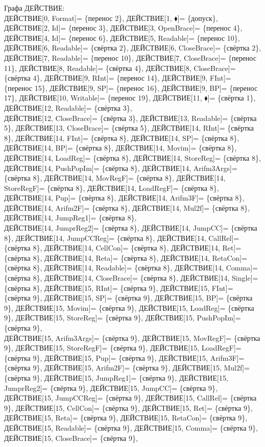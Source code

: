 \documentclass[a0]{a0poster}
\begin{document}
\tiny 
Графа ДЕЙСТВИЕ:\\
ДЕЙСТВИЕ[0, Format]= \{перенос 2\}, ДЕЙСТВИЕ[1, $\blacklozenge$]= \{допуск\}, ДЕЙСТВИЕ[2, Id]= \{перенос 3\}, ДЕЙСТВИЕ[3, OpenBrace]= \{перенос 4\}, ДЕЙСТВИЕ[4, Id]= \{перенос 6\}, ДЕЙСТВИЕ[5, Readable]= \{перенос 10\}, ДЕЙСТВИЕ[6, Readable]= \{свёртка 2\}, ДЕЙСТВИЕ[6, CloseBrace]= \{свёртка 2\}, ДЕЙСТВИЕ[7, Readable]= \{перенос 10\}, ДЕЙСТВИЕ[7, CloseBrace]= \{перенос 11\}, ДЕЙСТВИЕ[8, Readable]= \{свёртка 4\}, ДЕЙСТВИЕ[8, CloseBrace]= \{свёртка 4\}, ДЕЙСТВИЕ[9, RInt]= \{перенос 14\}, ДЕЙСТВИЕ[9, FInt]= \{перенос 15\}, ДЕЙСТВИЕ[9, SP]= \{перенос 16\}, ДЕЙСТВИЕ[9, BP]= \{перенос 17\}, ДЕЙСТВИЕ[10, Writable]= \{перенос 19\}, ДЕЙСТВИЕ[11, $\blacklozenge$]= \{свёртка 1\}, ДЕЙСТВИЕ[12, Readable]= \{свёртка 3\}, \\
ДЕЙСТВИЕ[12, CloseBrace]= \{свёртка 3\}, ДЕЙСТВИЕ[13, Readable]= \{свёртка 5\}, ДЕЙСТВИЕ[13, CloseBrace]= \{свёртка 5\}, ДЕЙСТВИЕ[14, RInt]= \{свёртка 8\}, ДЕЙСТВИЕ[14, FInt]= \{свёртка 8\}, ДЕЙСТВИЕ[14, SP]= \{свёртка 8\}, ДЕЙСТВИЕ[14, BP]= \{свёртка 8\}, ДЕЙСТВИЕ[14, Movim]= \{свёртка 8\}, ДЕЙСТВИЕ[14, LoadReg]= \{свёртка 8\}, ДЕЙСТВИЕ[14, StoreReg]= \{свёртка 8\}, ДЕЙСТВИЕ[14, PushPopIm]= \{свёртка 8\}, ДЕЙСТВИЕ[14, Arifm3Args]= \{свёртка 8\}, ДЕЙСТВИЕ[14, MovRegF]= \{свёртка 8\}, ДЕЙСТВИЕ[14, StoreRegF]= \{свёртка 8\}, ДЕЙСТВИЕ[14, LoadRegF]= \{свёртка 8\}, ДЕЙСТВИЕ[14, Pup]= \{свёртка 8\}, ДЕЙСТВИЕ[14, Arifm3F]= \{свёртка 8\}, ДЕЙСТВИЕ[14, Arifm2F]= \{свёртка 8\}, ДЕЙСТВИЕ[14, Mul2f]= \{свёртка 8\}, ДЕЙСТВИЕ[14, JumpReg1]= \{свёртка 8\}, \\
ДЕЙСТВИЕ[14, JumprReg2]= \{свёртка 8\}, ДЕЙСТВИЕ[14, JumpCC]= \{свёртка 8\}, ДЕЙСТВИЕ[14, JumpCCReg]= \{свёртка 8\}, ДЕЙСТВИЕ[14, CallRel]= \{свёртка 8\}, ДЕЙСТВИЕ[14, CellCon]= \{свёртка 8\}, ДЕЙСТВИЕ[14, Ret]= \{свёртка 8\}, ДЕЙСТВИЕ[14, Reta]= \{свёртка 8\}, ДЕЙСТВИЕ[14, RetaCon]= \{свёртка 8\}, ДЕЙСТВИЕ[14, Readable]= \{свёртка 8\}, ДЕЙСТВИЕ[14, Comma]= \{свёртка 8\}, ДЕЙСТВИЕ[14, CloseBrace]= \{свёртка 8\}, ДЕЙСТВИЕ[14, Single]= \{свёртка 8\}, ДЕЙСТВИЕ[15, RInt]= \{свёртка 9\}, ДЕЙСТВИЕ[15, FInt]= \{свёртка 9\}, ДЕЙСТВИЕ[15, SP]= \{свёртка 9\}, ДЕЙСТВИЕ[15, BP]= \{свёртка 9\}, ДЕЙСТВИЕ[15, Movim]= \{свёртка 9\}, ДЕЙСТВИЕ[15, LoadReg]= \{свёртка 9\}, ДЕЙСТВИЕ[15, StoreReg]= \{свёртка 9\}, ДЕЙСТВИЕ[15, PushPopIm]= \{свёртка 9\}, \\
ДЕЙСТВИЕ[15, Arifm3Args]= \{свёртка 9\}, ДЕЙСТВИЕ[15, MovRegF]= \{свёртка 9\}, ДЕЙСТВИЕ[15, StoreRegF]= \{свёртка 9\}, ДЕЙСТВИЕ[15, LoadRegF]= \{свёртка 9\}, ДЕЙСТВИЕ[15, Pup]= \{свёртка 9\}, ДЕЙСТВИЕ[15, Arifm3F]= \{свёртка 9\}, ДЕЙСТВИЕ[15, Arifm2F]= \{свёртка 9\}, ДЕЙСТВИЕ[15, Mul2f]= \{свёртка 9\}, ДЕЙСТВИЕ[15, JumpReg1]= \{свёртка 9\}, ДЕЙСТВИЕ[15, JumprReg2]= \{свёртка 9\}, ДЕЙСТВИЕ[15, JumpCC]= \{свёртка 9\}, ДЕЙСТВИЕ[15, JumpCCReg]= \{свёртка 9\}, ДЕЙСТВИЕ[15, CallRel]= \{свёртка 9\}, ДЕЙСТВИЕ[15, CellCon]= \{свёртка 9\}, ДЕЙСТВИЕ[15, Ret]= \{свёртка 9\}, ДЕЙСТВИЕ[15, Reta]= \{свёртка 9\}, ДЕЙСТВИЕ[15, RetaCon]= \{свёртка 9\}, ДЕЙСТВИЕ[15, Readable]= \{свёртка 9\}, ДЕЙСТВИЕ[15, Comma]= \{свёртка 9\}, ДЕЙСТВИЕ[15, CloseBrace]= \{свёртка 9\}, \\
\end{document}
